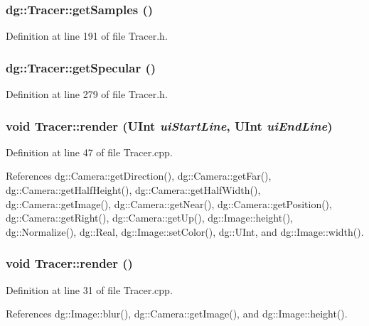 \subsubsection{ dg::Tracer::get\-Samples ()\hspace{0.3cm}{\tt  [inline]}}\label{classdg_1_1Tracer_a16}




Definition at line 191 of file Tracer.h.
\subsubsection{ dg::Tracer::get\-Specular ()\hspace{0.3cm}{\tt  [inline]}}\label{classdg_1_1Tracer_a26}




Definition at line 279 of file Tracer.h.
\subsubsection{\setlength{\rightskip}{0pt plus 5cm}void Tracer::render ({\bf UInt} {\em ui\-Start\-Line}, {\bf UInt} {\em ui\-End\-Line})}\label{classdg_1_1Tracer_a33}




Definition at line 47 of file Tracer.cpp.

References dg::Camera::get\-Direction(), dg::Camera::get\-Far(), dg::Camera::get\-Half\-Height(), dg::Camera::get\-Half\-Width(), dg::Camera::get\-Image(), dg::Camera::get\-Near(), dg::Camera::get\-Position(), dg::Camera::get\-Right(), dg::Camera::get\-Up(), dg::Image::height(), dg::Normalize(), dg::Real, dg::Image::set\-Color(), dg::UInt, and dg::Image::width().
\subsubsection{\setlength{\rightskip}{0pt plus 5cm}void Tracer::render ()}\label{classdg_1_1Tracer_a32}




Definition at line 31 of file Tracer.cpp.

References dg::Image::blur(), dg::Camera::get\-Image(), and dg::Image::height().

